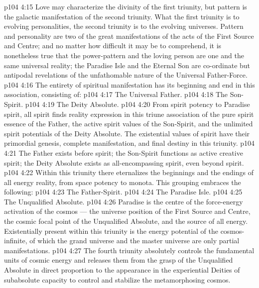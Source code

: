 \vs p104 4:15 Love may characterize the divinity of the first triunity, but pattern is the galactic manifestation of the second triunity. What the first triunity is to evolving personalities, the second triunity is to the evolving universes. Pattern and personality are two of the great manifestations of the acts of the First Source and Centre; and no matter how difficult it may be to comprehend, it is nonetheless true that the power\hyp{}pattern and the loving person are one and the same universal reality; the Paradise Isle and the Eternal Son are co\hyp{}ordinate but antipodal revelations of the unfathomable nature of the Universal Father\hyp{}Force.
\vs p104 4:16 \pc {} The entirety of spiritual manifestation has its beginning and end in this association, consisting of:
\vs p104 4:17 \bibnobreakspace The Universal Father.
\vs p104 4:18 \bibnobreakspace The Son\hyp{}Spirit.
\vs p104 4:19 \bibnobreakspace The Deity Absolute.
\vs p104 4:20 \pc From spirit potency to Paradise spirit, all spirit finds reality expression in this triune association of the pure spirit essence of the Father, the active spirit values of the Son\hyp{}Spirit, and the unlimited spirit potentials of the Deity Absolute. The existential values of spirit have their primordial genesis, complete manifestation, and final destiny in this triunity.
\vs p104 4:21 The Father exists before spirit; the Son\hyp{}Spirit functions as active creative spirit; the Deity Absolute exists as all\hyp{}encompassing spirit, even beyond spirit.
\vs p104 4:22 \pc {} Within this triunity there eternalizes the beginnings and the endings of all energy reality, from space potency to monota. This grouping embraces the following:
\vs p104 4:23 \bibnobreakspace The Father\hyp{}Spirit.
\vs p104 4:24 \bibnobreakspace The Paradise Isle.
\vs p104 4:25 \bibnobreakspace The Unqualified Absolute.
\vs p104 4:26 \pc Paradise is the centre of the force\hyp{}energy activation of the cosmos --- the universe position of the First Source and Centre, the cosmic focal point of the Unqualified Absolute, and the source of all energy. Existentially present within this triunity is the energy potential of the cosmos\hyp{}infinite, of which the grand universe and the master universe are only partial manifestations.
\vs p104 4:27 The fourth triunity absolutely controls the fundamental units of cosmic energy and releases them from the grasp of the Unqualified Absolute in direct proportion to the appearance in the experiential Deities of subabsolute capacity to control and stabilize the metamorphosing cosmos.
